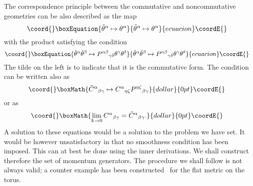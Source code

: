 \documentclass[12pt,a4paper]{article}
\newcounter{eg}
\def\t#1{\tilde #1}
\def\kbar{{\mathchar'26\mkern-9muk}}
\begin{document}
The correspondence principle between the commutative and
noncommutative geometries can be also described as the map
\begin{equation}\coord{}\boxEquation{
\t{\theta^\alpha}  \mapsto \theta^\alpha                      \label{cp}
}{
\t{\theta^\alpha}  \mapsto \theta^\alpha                      }{ecuacion}\coordE{}\end{equation}
with the product satisfying the condition
\begin{equation}\coord{}\boxEquation{
\t{\theta^\alpha} \t{\theta^\beta} \mapsto 
P^{\alpha\beta}{}_{\gamma\delta} \theta^\gamma \theta^\delta      \label{cp0}
}{
\t{\theta^\alpha} \t{\theta^\beta} \mapsto 
P^{\alpha\beta}{}_{\gamma\delta} \theta^\gamma \theta^\delta      }{ecuacion}\coordE{}\end{equation}
The tilde on the left is to indicate that it is the commutative form.
The condition can be written also as
$$\coord{}\boxMath{
\t{C}^\alpha{}_{\beta\gamma} \mapsto 
C^\alpha{}_{\eta\zeta} P^{\eta\zeta}{}_{\beta\gamma}
}{dollar}{0pt}\coordE{}$$
or as 
$$\coord{}\boxMath{
\lim_{\kbar\to 0}C^\alpha{}_{\beta\gamma} = \t{C}^\alpha{}_{\beta\gamma}.
}{dollar}{0pt}\coordE{}$$
A solution to these equations would be a solution to the problem we
have set. It would be however unsatisfactory in that no smoothness
condition has been imposed. This can at best be done using the inner
derivations. We shall construct therefore the set of momentum
generators. The procedure we shall follow is not always valid; a
counter example has been constructed~\cite{MadSae98} for the flat
metric on the torus.
\end{document}

